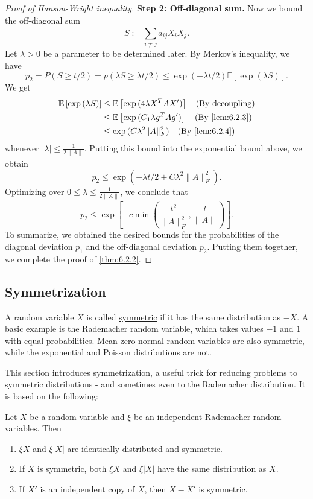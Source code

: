 \begin{proof}[Proof of Hanson-Wright inequality]
\textbf{Step 2: Off-diagonal sum.} Now we bound the off-diagonal sum
\[ S := \sum_{i \neq j}^{}a_{ij}X_iX_j. \]
Let $\lambda > 0$ be a parameter to be determined later. By Merkov's inequality, we have 
\[ p_2 = P(S \geq t/2) = p(\lambda S \geq \lambda t/2) \leq \exp{(-\lambda t/2)}\mathbb{E}\left[ 
\exp{(\lambda S)} \right]. \]
We get 
\begin{align*}
	\mathbb{E}\left[ \exp{(\lambda S)} \right] 
	&\leq \mathbb{E}\left[ \exp{(4 \lambda X^TAX')} \right] \quad (\text{By decoupling}) \\
	&\leq \mathbb{E}\left[ \exp{(C_1 \lambda g^TAg')} \right] \quad (\text{By \cref{lem:6.2.3}}) \\
	&\leq \exp{(C \lambda^2 \lVert A \rVert_{F}^2)} \quad (\text{By \cref{lem:6.2.4}})
\end{align*}
whenever $|\lambda| \leq \frac{1}{2 \lVert A \rVert_{}}$. Putting this bound into the exponential bound above, 
we obtain 
\[ p_2 \leq \exp{(-\lambda t/2 + C \lambda^2 \lVert A \rVert_{F}^2)}. \]
Optimizing over $0 \leq \lambda \leq \frac{1}{2 \lVert A \rVert_{}}$, we conclude that 
\[ p_2 \leq \exp{\left[ -c \min_{}\left( \frac{t^2}{\lVert A \rVert_{F}^2}, \frac{t}{\lVert A \rVert_{}}
\right) \right]}. \]
To summarize, we obtained the desired bounds for the probabilities of the diagonal deviation $p_1$ and the 
off-diagonal deviation $p_2$. Putting them together, we complete the proof of \cref{thm:6.2.2}.
\end{proof}



\subsection{Symmetrization}
A random variable $X$ is called \underline{symmetric} if it has the same distribution as $-X$. A basic example 
is the Rademacher random variable, which takes values $-1$ and $1$ with equal probabilities. Mean-zero normal 
random variables are also symmetric, while the exponential and Poisson distributions are not.

This section introduces \underline{symmetrization}, a useful trick for reducing problems to symmetric 
distributions - and sometimes even to the Rademacher distribution. It is based on the following:

\begin{lemma}
\label{lem:6.3.1}
Let $X$ be a random variable and $\xi$ be an independent Rademacher random variables. Then 
\begin{enumerate}
	\item $\xi X$ and $\xi |X|$ are identically distributed and symmetric.
	\item If $X$ is symmetric, both $\xi X$ and $\xi |X|$ have the same distribution as $X$. 
	\item If $X'$ is an independent copy of $X$, then $X - X'$ is symmetric.
\end{enumerate}
\end{lemma}

